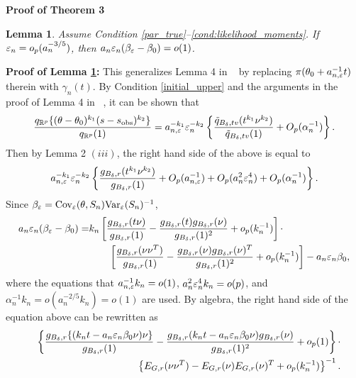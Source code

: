 \documentclass{article}
\newtheorem{lemma}{Lemma}
\begin{document}
\pagebreak 
{\bf Proof of Theorem 3}

\begin{lemma}\label{Alemma5} 
Assume Condition \ref{par_true}--\ref{cond:likelihood_moments}. If $\varepsilon_{n}=o_{p}(a_{n}^{-3/5})$, then $a_{n}\varepsilon_{n}(\beta_{\varepsilon}-\beta_{0})=o(1)$.
\end{lemma}
{\bf Proof of Lemma \ref{Alemma5}:} 
	This generalizes Lemma 4 in ~\cite{Li2017} by replacing $\pi(\theta_{0}+a_{n,\varepsilon}^{-1}t)$
	therein with $\gamma_{n}(t)$. By Condition \ref{initial_upper} and the arguments in the proof
	of Lemma 4 in ~\cite{Li2017}, it can be shown that 
	\[
	\frac{q_{\mathbb{R}^{p}}\{(\theta-\theta_{0})^{k_{1}}(s-s_{\rm obs})^{k_{2}}\}}{q_{\mathbb{R}^{p}}(1)}=a_{n,\varepsilon}^{-k_{1}}\varepsilon_{n}^{-k_{2}}\left\{ \frac{\tilde{q}_{B_{\delta},tv}(t^{k_{1}}\nu^{k_{2}})}{\tilde{q}_{B_{\delta},tv}(1)}+O_{p}(\alpha_{n}^{-1})\right\} .
	\]
	Then by Lemma 2 $(iii)$, the right hand side of the above is equal
	to 
	\[
	a_{n,\varepsilon}^{-k_{1}}\varepsilon_{n}^{-k_{2}}\left\{ \frac{g_{B_{\delta},r}(t^{k_{1}}\nu^{k_{2}})}{g_{B_{\delta},r}(1)}+O_{p}(a_{n,\varepsilon}^{-1})+O_{p}(a_{n}^{2}\varepsilon_{n}^{4})+O_{p}(\alpha_{n}^{-1})\right\} .
	\]
	Since $\beta_{\varepsilon}=\text{Cov}_{\varepsilon}(\theta,S_{n})\text{Var}_{\varepsilon}(S_{n})^{-1}$,
	\begin{align*}
	a_{n}\varepsilon_{n}(\beta_{\varepsilon}-\beta_{0})= & k_{n}\left[\frac{g_{B_{\delta},r}(t\nu)}{g_{B_{\delta},r}(1)}-\frac{g_{B_{\delta},r}(t)g_{B_{\delta},r}(\nu)}{g_{B_{\delta},r}(1)^{2}}+o_{p}(k_{n}^{-1})\right]\cdot\\
	& \qquad\left[\frac{g_{B_{\delta},r}(\nu\nu^{T})}{g_{B_{\delta},r}(1)}-\frac{g_{B_{\delta},r}(\nu)g_{B_{\delta},r}(\nu)^{T}}{g_{B_{\delta},r}(1)^{2}}+o_{p}(k_{n}^{-1})\right]-a_{n}\varepsilon_{n}\beta_{0},
	\end{align*}
	where the equations that $a_{n,\varepsilon}^{-1}k_{n}=o(1)$, $a_{n}^{2}\varepsilon_{n}^{4}k_{n}=o(p)$,
	and $\alpha_{n}^{-1}k_{n}=o(a_{n}^{-2/5}k_{n})=o(1)$ are used. By
	algebra, the right hand side of the equation above can be rewritten
	as 
	\begin{eqnarray*}
		&  & \left\{ \frac{g_{B_{\delta},r}\{(k_{n}t-a_{n}\varepsilon_{n}\beta_{0}\nu)\nu\}}{g_{B_{\delta},r}(1)}-\frac{g_{B_{\delta},r}(k_{n}t-a_{n}\varepsilon_{n}\beta_{0}\nu)g_{B_{\delta},r}(\nu)}{g_{B_{\delta},r}(1)^{2}}+o_{p}(1)\right\} \cdot\\
		&  & \qquad\left\{ E_{G,r}(\nu\nu^{T})-E_{G,r}(\nu)E_{G,r}(\nu)^{T}+o_{p}(k_{n}^{-1})\right\} ^{-1}.
	\end{eqnarray*}
\end{document}

